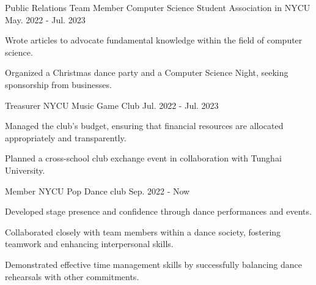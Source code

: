 


\begin{cventries}
\cventry
{Public Relations Team Member} %
{Computer Science Student Association in NYCU} %
{} %
{May. 2022 - Jul. 2023} %
{
  \begin{cvitems} %
    \item {Wrote articles to advocate fundamental knowledge within the field of computer science. {\href{https://medium.com/@csunion.nctu}{ \faMedium\acvHeaderIconSep\@Medium}}}
    \item {Organized a Christmas dance party and a Computer Science Night, seeking sponsorship from businesses.}
  \end{cvitems}
}


  \cventry
    {Treasurer} %
    {NYCU Music Game Club} %
    {} %
    {Jul. 2022 - Jul. 2023} %
    {
      \begin{cvitems} %
        \item {Managed the club's budget, ensuring that financial resources are allocated appropriately and transparently.}
        \item {Planned a cross-school club exchange event in collaboration with Tunghai University.}
      \end{cvitems}
    }


\cventry
{Member} %
{NYCU Pop Dance club} %
{} %
{Sep. 2022 - Now} %
{
  \begin{cvitems} %
    \item {Developed stage presence and confidence through dance performances and events.}
    \item {Collaborated closely with team members within a dance society, fostering teamwork and enhancing interpersonal skills.}
    \item {Demonstrated effective time management skills by successfully balancing dance rehearsals with other commitments.}
  \end{cvitems}
}

\end{cventries}